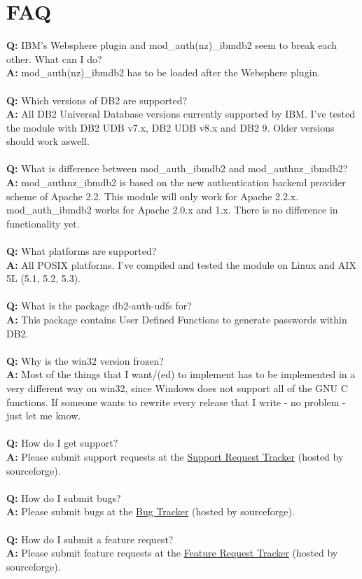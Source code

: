 \documentclass[11pt,a4paper]{article}
\begin{document}
\section{FAQ}
\textbf{Q:} IBM's Websphere plugin and mod\_auth(nz)\_ibmdb2 seem to break each other. What can I do? \\
\textbf{A:} mod\_auth(nz)\_ibmdb2 has to be loaded after the Websphere plugin. \\
\\
\textbf{Q:} Which versions of DB2 are supported? \\
\textbf{A:} All DB2 Universal Database versions currently supported by IBM. I've tested the module with DB2 UDB v7.x, DB2 UDB v8.x and DB2 9. Older versions should work aswell. \\
\\
\textbf{Q:} What is difference between mod\_auth\_ibmdb2 and mod\_authnz\_ibmdb2? \\
\textbf{A:} mod\_authnz\_ibmdb2 is based on the new authentication backend provider scheme of Apache 2.2. This module will only work for Apache 2.2.x. \linebreak[4] mod\_auth\_ibmdb2 works for Apache 2.0.x and 1.x. There is no difference in functionality yet. \\
\\
\textbf{Q:} What platforms are supported? \\
\textbf{A:} All POSIX platforms. I've compiled and tested the module on Linux and AIX 5L (5.1, 5.2, 5.3). \\
\\
\textbf{Q:} What is the package db2-auth-udfs for? \\
\textbf{A:} This package contains User Defined Functions to generate passwords within DB2. \\
\\
\textbf{Q:} Why is the win32 version frozen? \\
\textbf{A:} Most of the things that I want/(ed) to implement has to be implemented in a very different way on win32, since Windows does not support all of the GNU C functions. If someone wants to rewrite every release that I write - no problem - just let me know. \\
\\
\textbf{Q:} How do I get support? \\
\textbf{A:} Please submit support requests at the \href{http://sourceforge.net/tracker/?atid=633718&group_id=103064&func=browse}{Support Request Tracker} (hosted by sourceforge). \\
\\
\textbf{Q:} How do I submit bugs? \\
\textbf{A:} Please submit bugs at the \href{http://sourceforge.net/tracker/?atid=633717&group_id=103064&func=browse}{Bug Tracker} (hosted by sourceforge). \\
\\
\textbf{Q:} How do I submit a feature request? \\
\textbf{A:} Please submit feature requests at the \href{http://sourceforge.net/tracker/?atid=633720&group_id=103064&func=browse}{Feature Request Tracker} (hosted by sourceforge). \\ 
\newpage
\end{document}
